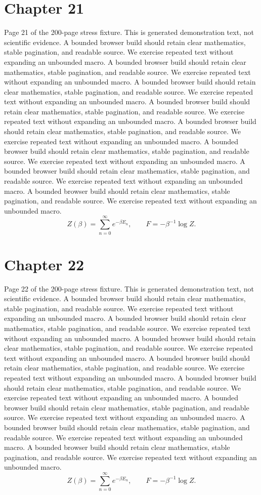 \documentclass[11pt]{article}
\begin{document}
\section*{Chapter 21}
Page 21 of the 200-page stress fixture. This is generated demonstration text, not scientific evidence.
A bounded browser build should retain clear mathematics, stable pagination, and readable source. We exercise repeated text without expanding an unbounded macro.
A bounded browser build should retain clear mathematics, stable pagination, and readable source. We exercise repeated text without expanding an unbounded macro.
A bounded browser build should retain clear mathematics, stable pagination, and readable source. We exercise repeated text without expanding an unbounded macro.
A bounded browser build should retain clear mathematics, stable pagination, and readable source. We exercise repeated text without expanding an unbounded macro.
A bounded browser build should retain clear mathematics, stable pagination, and readable source. We exercise repeated text without expanding an unbounded macro.
A bounded browser build should retain clear mathematics, stable pagination, and readable source. We exercise repeated text without expanding an unbounded macro.
A bounded browser build should retain clear mathematics, stable pagination, and readable source. We exercise repeated text without expanding an unbounded macro.
A bounded browser build should retain clear mathematics, stable pagination, and readable source. We exercise repeated text without expanding an unbounded macro.
\[Z(\beta)=\sum_{n=0}^{\infty}e^{-\beta E_n},\qquad F=-\beta^{-1}\log Z.\]
\newpage
\section*{Chapter 22}
Page 22 of the 200-page stress fixture. This is generated demonstration text, not scientific evidence.
A bounded browser build should retain clear mathematics, stable pagination, and readable source. We exercise repeated text without expanding an unbounded macro.
A bounded browser build should retain clear mathematics, stable pagination, and readable source. We exercise repeated text without expanding an unbounded macro.
A bounded browser build should retain clear mathematics, stable pagination, and readable source. We exercise repeated text without expanding an unbounded macro.
A bounded browser build should retain clear mathematics, stable pagination, and readable source. We exercise repeated text without expanding an unbounded macro.
A bounded browser build should retain clear mathematics, stable pagination, and readable source. We exercise repeated text without expanding an unbounded macro.
A bounded browser build should retain clear mathematics, stable pagination, and readable source. We exercise repeated text without expanding an unbounded macro.
A bounded browser build should retain clear mathematics, stable pagination, and readable source. We exercise repeated text without expanding an unbounded macro.
A bounded browser build should retain clear mathematics, stable pagination, and readable source. We exercise repeated text without expanding an unbounded macro.
\[Z(\beta)=\sum_{n=0}^{\infty}e^{-\beta E_n},\qquad F=-\beta^{-1}\log Z.\]
\newpage
\end{document}
